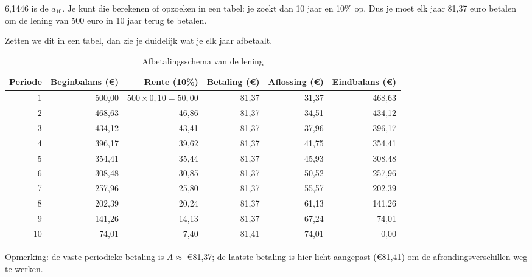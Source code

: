 \documentclass[a4paper,11pt]{article}
\begin{document}
6,1446 is de  $a_{10}$. Je kunt die berekenen of opzoeken in een tabel:
je zoekt dan 10 jaar en 10\% op.
Dus je moet elk jaar 81,37 euro betalen om de lening van 500 euro in 10 jaar terug te betalen.
\newline

Zetten we dit in een tabel, dan zie je duidelijk wat je elk jaar afbetaalt.
\begin{table}[H]
    \centering
    \caption{Afbetalingsschema van de lening}
    \begin{tabular}{r r r r r r}
        \toprule
        Periode & Beginbalans (€) & Rente (10\%)         & Betaling (€) & Aflossing (€) & Eindbalans (€) \\
        \midrule
        1       & 500,00          & $500 \times 0{,}10 = 50{,}00$ & 81,37        & 31,37         & 468,63         \\
        2       & 468,63          & 46,86                         & 81,37        & 34,51         & 434,12         \\
        3       & 434,12          & 43,41                         & 81,37        & 37,96         & 396,17         \\
        4       & 396,17          & 39,62                         & 81,37        & 41,75         & 354,41         \\
        5       & 354,41          & 35,44                         & 81,37        & 45,93         & 308,48         \\
        6       & 308,48          & 30,85                         & 81,37        & 50,52         & 257,96         \\
        7       & 257,96          & 25,80                         & 81,37        & 55,57         & 202,39         \\
        8       & 202,39          & 20,24                         & 81,37        & 61,13         & 141,26         \\
        9       & 141,26          & 14,13                         & 81,37        & 67,24         & 74,01          \\
        10      & 74,01           & 7,40                          & 81,41        & 74,01         & 0,00           \\
        \bottomrule
    \end{tabular}
\end{table}

Opmerking: de vaste periodieke betaling is $A \approx$ €81,37; de laatste betaling is hier licht
aangepast (€81,41) om de afrondingsverschillen weg te werken.
\end{document}
